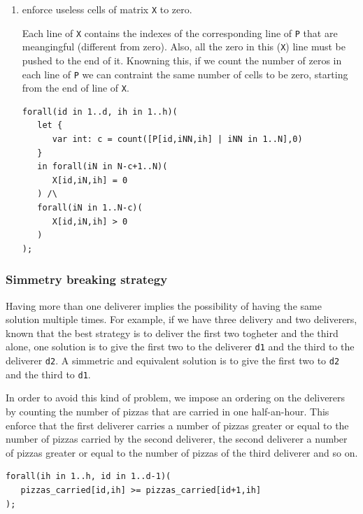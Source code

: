 \documentclass[10pt]{article}
\begin{document}
\begin{enumerate}
		\item enforce useless cells of matrix \texttt{X} to zero.
		
		Each line of \texttt{X} contains the indexes of the corresponding line of \texttt{P}
		that are meangingful (different from zero). Also, all the zero in this (\texttt{X}) 
		line must be pushed to the end of it. Knowning this, if we count the number of zeros
		in each line of \texttt{P} we can contraint the same number of cells to be zero, starting
		from the end of line of \texttt{X}.

		\begin{verbatim}
forall(id in 1..d, ih in 1..h)(
   let {
      var int: c = count([P[id,iNN,ih] | iNN in 1..N],0)
   }
   in forall(iN in N-c+1..N)(
      X[id,iN,ih] = 0
   ) /\
   forall(iN in 1..N-c)(
      X[id,iN,ih] > 0
   )
);
		\end{verbatim}
		
	\end{enumerate}

	\subsubsection{Simmetry breaking strategy}
	Having more than one deliverer implies the possibility of having the same solution 
	multiple times. For example, if we have three delivery and two deliverers, known that
	the best strategy is to deliver the first two togheter and the third alone, one solution is 
	to give the first two to the deliverer \texttt{d1} and the third to the deliverer \texttt{d2}.
	A simmetric and equivalent solution is to give the first two to \texttt{d2} and 
	the third to \texttt{d1}.

	In order to avoid this kind of problem, we impose an ordering on the deliverers by 
	counting the number of pizzas that are carried in one half-an-hour. This enforce that 
	the first deliverer carries a number of pizzas greater or equal to the number of
	pizzas carried by the second deliverer, the second deliverer a number of pizzas greater or 
	equal to the number of pizzas of the third deliverer and so on.
\begin{verbatim}
forall(ih in 1..h, id in 1..d-1)(
   pizzas_carried[id,ih] >= pizzas_carried[id+1,ih]
);
\end{verbatim}

%
%
\end{document}
